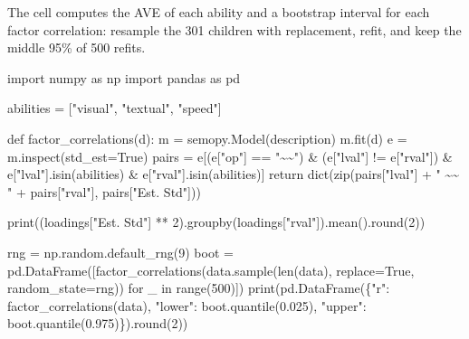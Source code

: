 \documentclass[
  letterpaper,
  10pt,
  twoside,
  openright,
  numbers=noenddot,
  chapterprefix=true]{scrbook}
\newenvironment{Shaded}{}{}
\newcommand{\BuiltInTok}[1]{\textcolor[rgb]{0.84,0.23,0.29}{#1}}
\newcommand{\ControlFlowTok}[1]{\textcolor[rgb]{0.84,0.23,0.29}{#1}}
\newcommand{\DecValTok}[1]{\textcolor[rgb]{0.00,0.36,0.77}{#1}}
\newcommand{\FloatTok}[1]{\textcolor[rgb]{0.00,0.36,0.77}{#1}}
\newcommand{\ImportTok}[1]{\textcolor[rgb]{0.01,0.18,0.38}{#1}}
\newcommand{\KeywordTok}[1]{\textcolor[rgb]{0.84,0.23,0.29}{#1}}
\newcommand{\NormalTok}[1]{\textcolor[rgb]{0.14,0.16,0.18}{#1}}
\newcommand{\OperatorTok}[1]{\textcolor[rgb]{0.14,0.16,0.18}{#1}}
\newcommand{\StringTok}[1]{\textcolor[rgb]{0.01,0.18,0.38}{#1}}
\newcommand{\VariableTok}[1]{\textcolor[rgb]{0.89,0.38,0.04}{#1}}
\begin{document}
The cell computes the AVE of each ability and a bootstrap interval for
each factor correlation: resample the 301 children with replacement,
refit, and keep the middle 95\% of 500 refits.

\label{check-hs-distinct}
\begin{Shaded}
\begin{Highlighting}[]
\ImportTok{import}\NormalTok{ numpy }\ImportTok{as}\NormalTok{ np}
\ImportTok{import}\NormalTok{ pandas }\ImportTok{as}\NormalTok{ pd}

\NormalTok{abilities }\OperatorTok{=}\NormalTok{ [}\StringTok{"visual"}\NormalTok{, }\StringTok{"textual"}\NormalTok{, }\StringTok{"speed"}\NormalTok{]}

\KeywordTok{def}\NormalTok{ factor\_correlations(d):}
\NormalTok{    m }\OperatorTok{=}\NormalTok{ semopy.Model(description)}
\NormalTok{    m.fit(d)}
\NormalTok{    e }\OperatorTok{=}\NormalTok{ m.inspect(std\_est}\OperatorTok{=}\VariableTok{True}\NormalTok{)}
\NormalTok{    pairs }\OperatorTok{=}\NormalTok{ e[(e[}\StringTok{"op"}\NormalTok{] }\OperatorTok{==} \StringTok{"\textasciitilde{}\textasciitilde{}"}\NormalTok{) }\OperatorTok{\&}\NormalTok{ (e[}\StringTok{"lval"}\NormalTok{] }\OperatorTok{!=}\NormalTok{ e[}\StringTok{"rval"}\NormalTok{])}
              \OperatorTok{\&}\NormalTok{ e[}\StringTok{"lval"}\NormalTok{].isin(abilities) }\OperatorTok{\&}\NormalTok{ e[}\StringTok{"rval"}\NormalTok{].isin(abilities)]}
    \ControlFlowTok{return} \BuiltInTok{dict}\NormalTok{(}\BuiltInTok{zip}\NormalTok{(pairs[}\StringTok{"lval"}\NormalTok{] }\OperatorTok{+} \StringTok{" \textasciitilde{}\textasciitilde{} "} \OperatorTok{+}\NormalTok{ pairs[}\StringTok{"rval"}\NormalTok{], pairs[}\StringTok{"Est. Std"}\NormalTok{]))}

\BuiltInTok{print}\NormalTok{((loadings[}\StringTok{"Est. Std"}\NormalTok{] }\OperatorTok{**} \DecValTok{2}\NormalTok{).groupby(loadings[}\StringTok{"rval"}\NormalTok{]).mean().}\BuiltInTok{round}\NormalTok{(}\DecValTok{2}\NormalTok{))}

\NormalTok{rng }\OperatorTok{=}\NormalTok{ np.random.default\_rng(}\DecValTok{9}\NormalTok{)}
\NormalTok{boot }\OperatorTok{=}\NormalTok{ pd.DataFrame([factor\_correlations(data.sample(}\BuiltInTok{len}\NormalTok{(data), replace}\OperatorTok{=}\VariableTok{True}\NormalTok{,}
\NormalTok{                                                     random\_state}\OperatorTok{=}\NormalTok{rng))}
                     \ControlFlowTok{for}\NormalTok{ \_ }\KeywordTok{in} \BuiltInTok{range}\NormalTok{(}\DecValTok{500}\NormalTok{)])}
\BuiltInTok{print}\NormalTok{(pd.DataFrame(\{}\StringTok{"r"}\NormalTok{: factor\_correlations(data),}
                    \StringTok{"lower"}\NormalTok{: boot.quantile(}\FloatTok{0.025}\NormalTok{),}
                    \StringTok{"upper"}\NormalTok{: boot.quantile(}\FloatTok{0.975}\NormalTok{)\}).}\BuiltInTok{round}\NormalTok{(}\DecValTok{2}\NormalTok{))}
\end{Highlighting}
\end{Shaded}
\end{document}
